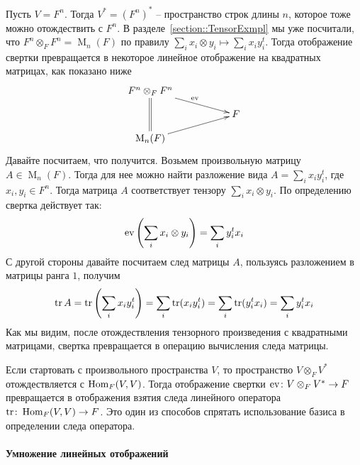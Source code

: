 Пусть $V = F^n$. Тогда $V^* = (F^n)^*$ -- пространство строк длины $n$, которое тоже можно отождествить с $F^n$. В разделе~\ref{section::TensorExmpl} мы уже посчитали, что $F^n\otimes_F F^n = \operatorname{M}_n(F)$ по правилу $\sum_i x_i\otimes y_i\mapsto \sum_i x_i y_i^t$. Тогда отображение свертки превращается в некоторое линейное отображение на квадратных матрицах, как показано ниже
\[
\xymatrix@R=10pt{
	{F^n\otimes_F F^n}\ar@{=}[dd]\ar[rrd]^{\ev}&{}&{}\\
	{}&{}&{F}\\
	{\operatorname{M}_n(F)}\ar[rru]&{}&{}\\
}
\]
Давайте посчитаем, что получится. Возьмем произвольную матрицу $A\in \operatorname{M}_n(F)$. Тогда для нее можно найти разложение вида $A = \sum_i x_iy_i^t$, где $x_i,y_i\in F^n$. Тогда матрица $A$ соответствует тензору $\sum_i x_i \otimes y_i$. По определению свертка действует так:
\[
\operatorname{ev}\left(\sum_i x_i\otimes y_i\right) = \sum_i y_i^t x_i
\]
С другой стороны давайте посчитаем след матрицы $A$, пользуясь разложением в матрицы ранга $1$, получим
\[
\operatorname{tr} A = \operatorname{tr}\left(\sum_i x_i y_i^t\right) = \sum_i \operatorname{tr}(x_i y_i^t) = \sum_i \operatorname{tr}(y_i^t x_i) = \sum_i y_i^t x_i
\]
Как мы видим, после отождествления тензорного произведения с квадратными матрицами, свертка превращается в операцию вычисления следа матрицы.

Если стартовать с произвольного пространства $V$,  то пространство $V\otimes_F V^*$ отождествляется с $\operatorname{Hom}_F(V, V)$. Тогда отображение свертки $\operatorname{ev}\colon V\otimes_F V^*\to F$ превращается в отображения взятия следа линейного оператора $\operatorname{tr}\colon \operatorname{Hom}_F(V, V)\to F$. Это один из способов спрятать использование базиса в определении следа оператора.


\paragraph{Умножение линейных отображений}

